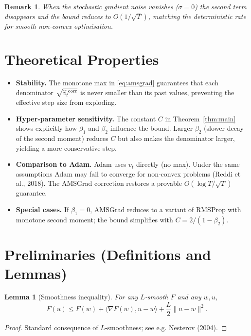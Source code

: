 \documentclass{article}
\newtheorem{lemma}{Lemma}
\newtheorem{remark}{Remark}
\begin{document}
\begin{remark}
When the stochastic gradient noise vanishes ($\sigma=0$) the second term disappears and the bound reduces to $O(1/\sqrt{T})$, matching the deterministic rate for smooth non‑convex optimisation.
\end{remark}

\section*{Theoretical Properties}
\begin{itemize}[leftmargin=*]
\item \textbf{Stability.} The monotone max in \eqref{eq:amsgrad} guarantees that each denominator $\sqrt{\widehat v_t^{\;{\rm corr}}}$ is never smaller than its past values, preventing the effective step size from exploding.
\item \textbf{Hyper‑parameter sensitivity.} The constant $C$ in Theorem~\ref{thm:main} shows explicitly how $\beta_1$ and $\beta_2$ influence the bound.  Larger $\beta_2$ (slower decay of the second moment) reduces $C$ but also makes the denominator larger, yielding a more conservative step.
\item \textbf{Comparison to Adam.} Adam uses $v_t$ directly (no max).  Under the same assumptions Adam may fail to converge for non‑convex problems (Reddi et al., 2018).  The AMSGrad correction restores a provable $O(\log T/\sqrt{T})$ guarantee.
\item \textbf{Special cases.} If $\beta_1=0$, AMSGrad reduces to a variant of RMSProp with monotone second moment; the bound simplifies with $C=2/(1-\beta_2)$.
\end{itemize}

\section*{Preliminaries (Definitions and Lemmas)}
\begin{lemma}[Smoothness inequality]\label{lem:smooth}
For any $L$‑smooth $F$ and any $w,u$,
\[
F(u) \le F(w) + \langle\nabla F(w),u-w\rangle + \frac{L}{2}\|u-w\|^2 .
\]
\end{lemma}
\begin{proof}
Standard consequence of $L$‑smoothness; see e.g. Nesterov (2004). \qedhere
\end{proof}
\end{document}
